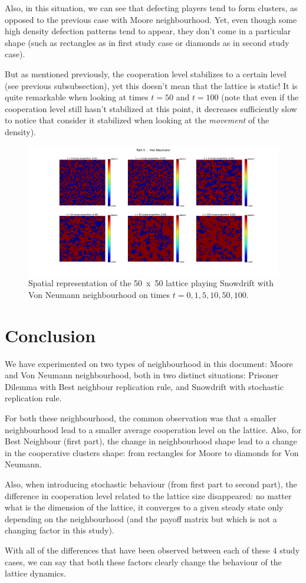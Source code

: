 \documentclass{article}
\begin{document}
Also, in this situation, we can see that defecting players tend to form clusters, as opposed to the previous
case with Moore neighbourhood. Yet, even though some high density defection patterns tend to appear, they don't
come in a particular shape (such as rectangles as in first study case or diamonds as in second study case).

But as mentioned previously, the cooperation level stabilizes to a certain level (see previous subsubsection),
yet this doesn't mean that the lattice is static! It is quite remarkable when looking at times $t=50$ and $t=100$
(note that even if the cooperation level still hasn't stabilized at this point, it decreases sufficiently
slow to notice that consider it stabilized when looking at the \textit{movement} of the density).

\begin{figure}[!t]
\hspace{-1.8cm}
\includegraphics[width=1.2\textwidth]{imgs/part2_VN_periods.png}
\caption{Spatial representation of the 50~x~50 lattice playing Snowdrift with Von Neumann neighbourhood on
times $t=0,1,5,10,50,100$.\label{fig:spatial representation part II VN}}
\end{figure}

\section{Conclusion}

We have experimented on two types of neighbourhood in this document: Moore and Von Neumann neighbourhood,
both in two distinct situations: Prisoner Dilemma with Best neighbour replication rule, and Snowdrift with
stochastic replication rule.

For both these neighbourhood, the common observation was that a smaller neighbourhood lead to a smaller
average cooperation level on the lattice. Also, for Best Neighbour (first part), the change in neighbourhood
shape lead to a change in the cooperative clusters shape: from rectangles for Moore to diamonds for Von Neumann.

Also, when introducing stochastic behaviour (from first part to second part), the difference in cooperation level
related to the lattice size disappeared: no matter what is the dimension of the lattice, it converges to a given
steady state only depending on the neighbourhood (and the payoff matrix but which is not a changing factor in
this study).

With all of the differences that have been observed between each of these 4 study cases, we can say that both
these factors clearly change the behaviour of the lattice dynamics.
\end{document}
